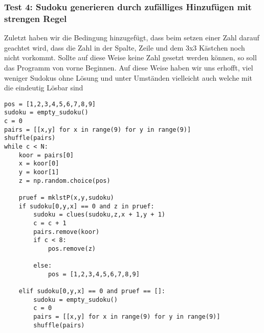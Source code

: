 \documentclass[11pt,a4paper]{article}
\begin{document}
\subsubsection{Test 4: Sudoku generieren durch zufälliges Hinzufügen mit strengen Regel}
Zuletzt haben wir die Bedingung hinzugefügt, dass beim setzen einer Zahl darauf geachtet wird, dass die Zahl in der Spalte, Zeile und dem 3x3 Kästchen noch nicht vorkommt. Sollte auf diese Weise keine Zahl gesetzt werden können, so soll das Programm von vorne Beginnen. Auf diese Weise haben wir uns erhofft, viel weniger Sudokus ohne Lösung und unter Umständen vielleicht auch welche mit die eindeutig Lösbar sind
\ \\
\begin{verbatim}                       
pos = [1,2,3,4,5,6,7,8,9]                             
sudoku = empty_sudoku()          
c = 0                            
pairs = [[x,y] for x in range(9) for y in range(9)]
shuffle(pairs)
while c < N:                                  
    koor = pairs[0]
    x = koor[0]                               
    y = koor[1]                               
    z = np.random.choice(pos)                 
            
    pruef = mklstP(x,y,sudoku)                
    if sudoku[0,y,x] == 0 and z in pruef:     
        sudoku = clues(sudoku,z,x + 1,y + 1)  
        c = c + 1                             
        pairs.remove(koor)
        if c < 8:                             
            pos.remove(z)                     
                                                     
        else:                                 
            pos = [1,2,3,4,5,6,7,8,9]         
                    
    elif sudoku[0,y,x] == 0 and pruef == []:  
        sudoku = empty_sudoku()               
        c = 0                                 
        pairs = [[x,y] for x in range(9) for y in range(9)]
        shuffle(pairs)
\end{verbatim}
\ \\
\end{document}
